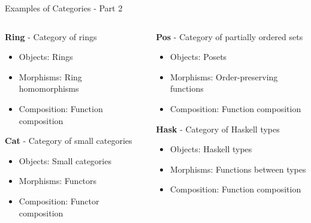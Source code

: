 \documentclass{beamer}
\begin{document}
\begin{frame}{Examples of Categories - Part 2}
    \begin{columns}
        \begin{column}{0.5\textwidth}
            \textbf{Ring} - Category of rings
            \begin{itemize}
                \item Objects: Rings
                \item Morphisms: Ring homomorphisms
                \item Composition: Function composition
            \end{itemize}
            
            \vspace{0.3cm}
            \textbf{Cat} - Category of small categories
            \begin{itemize}
                \item Objects: Small categories
                \item Morphisms: Functors
                \item Composition: Functor composition
            \end{itemize}
        \end{column}
        \begin{column}{0.5\textwidth}
            \textbf{Pos} - Category of partially ordered sets
            \begin{itemize}
                \item Objects: Posets
                \item Morphisms: Order-preserving functions
                \item Composition: Function composition
            \end{itemize}
            
            \vspace{0.3cm}
            \textbf{Hask} - Category of Haskell types
            \begin{itemize}
                \item Objects: Haskell types
                \item Morphisms: Functions between types
                \item Composition: Function composition
            \end{itemize}
        \end{column}
    \end{columns}
\end{frame}
\end{document}
